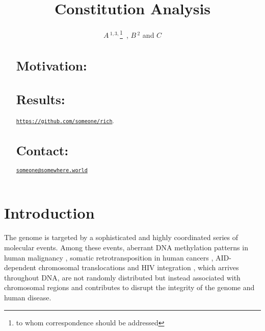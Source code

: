 \documentclass{bioinfo}
\begin{document}
\title[AID hotspots]{Constitution Analysis} 
 \author[I. T. Silva~\textit{et~al}]{%
     $A$\,$^{1,3,}$\footnote{to
  whom correspondence should be addressed}\ , 
     $B$\,$^2$ and
     $C$
  }

 \address{$^{1}$Laboratory of Molecular Immunology, The Rockefeller 
     University, 1230 York Avenue, New York, NY 10065\\
     $^{2}$Departamento de Computa\c{c}\~ao e Matem\'atica,
     Universidade de S\~ao Paulo. Av. Bandeirantes, 3900,
     Ribeir\~ao Preto,  CEP 14049-901, SP, Brazil%
}


\maketitle
\begin{abstract}
  \section{Motivation:}
  \section{Results:} 
  \href{https://github.com/someone/rich}{\texttt{https://github.com/someone/rich}}.
  \section{Contact:}
  \href{mailto:someone@somewhere.world}{\tt someone@somewhere.world}%
\end{abstract}

\section{Introduction}
The genome is targeted by a sophisticated and highly coordinated series of molecular events. Among these events, aberrant DNA methylation patterns in human malignancy \cite{pmid23326238}, somatic retrotransposition in human cancers \cite{pmid22745252}, AID-dependent chromosomal translocations \cite{pmid21962510} and HIV integration \cite{pmid22762018}, which arrives throughout DNA, are not randomly distributed but instead associated with chromosomal regions and contributes to disrupt the integrity of the genome and human disease. 
\end{document}
